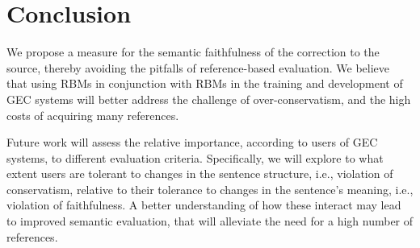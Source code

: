 \documentclass[a4paper, 11pt]{article}
\begin{document}
\section{Conclusion}
\vspace{-.1cm}

We propose a measure for the semantic faithfulness of the correction to the source,
thereby avoiding the pitfalls of reference-based evaluation. We believe that using RBMs in conjunction with RBMs in the training and development of GEC
systems will better address the challenge of over-conservatism, and the 
high costs of acquiring many references.

Future work will assess the relative importance, according to users of GEC systems,
to different evaluation criteria.
Specifically, we will explore to what extent users are
tolerant to changes in the sentence structure, i.e.,
violation of conservatism, relative to their tolerance to changes 
in the sentence's meaning, i.e., violation of faithfulness.
A better understanding of how these interact
may lead to improved semantic evaluation, that will alleviate the need
for a high number of references.




\end{document}
